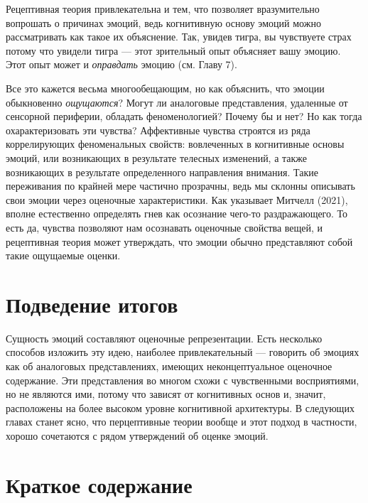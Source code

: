 \documentclass[11pt]{book}
\begin{document}
Рецептивная теория привлекательна и тем, что позволяет вразумительно вопрошать о причинах эмоций, ведь когнитивную основу эмоций можно рассматривать как такое их объяснение. Так, увидев тигра, вы чувствуете страх потому что увидели тигра --- этот зрительный опыт объясняет вашу эмоцию. Этот опыт может и \textit{оправдать} эмоцию (см. Главу 7).

Все это кажется весьма многообещающим, но как объяснить, что эмоции обыкновенно \textit{ощущаются}? Могут ли аналоговые представления, удаленные от сенсорной периферии, обладать феноменологией? Почему бы и нет? Но как тогда охарактеризовать эти чувства? Аффективные чувства строятся из ряда коррелирующих феноменальных свойств: вовлеченных в когнитивные основы эмоций, или возникающих в результате телесных изменений, а также возникающих в результате определенного направления внимания. Такие переживания по крайней мере частично прозрачны, ведь мы склонны описывать свои эмоции через оценочные характеристики. Как указывает Митчелл (2021), вполне естественно определять гнев как осознание чего-то раздражающего. То есть да, чувства позволяют нам осознавать оценочные свойства вещей, и рецептивная теория может утверждать, что эмоции обычно представляют собой такие ощущаемые оценки.

\section{Подведение итогов}

Сущность эмоций составляют оценочные репрезентации. Есть несколько способов изложить эту идею, наиболее привлекательный --- говорить об эмоциях как об аналоговых представлениях, имеющих неконцептуальное оценочное содержание. Эти представления во многом схожи с чувственными восприятиями, но не являются ими, потому что зависят от когнитивных основ и, значит, расположены на более высоком уровне когнитивной архитектуры. В следующих главах станет ясно, что перцептивные теории вообще и этот подход в частности, хорошо сочетаются с рядом утверждений об оценке эмоций.

\section{Краткое содержание}
\end{document}
